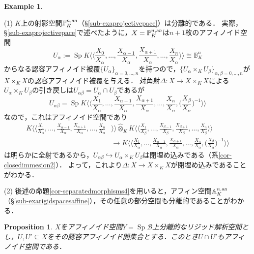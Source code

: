 \documentclass[a4paper,12pt, dvipdfmx]{jsbook}
\def\P{\mathbb{P}}
\def\A{\mathbb{A}}
\def\B{\mathbb{B}}
\def\Sp{\mathop{\mathrm{Sp}}\nolimits}
\def\an{\textsl{an}}
\def\dl{\langle\!\langle}
\def\dr{\rangle\!\rangle}
\theoremstyle{plain}
\newtheorem{prop}[thm]{\bfseries Proposition}
\theoremstyle{definition}
\newtheorem{exa}[thm]{\bfseries Example}
\begin{document}
\begin{exa}\label{exa-separatedmorphisms}{\rm 
(1) $K$上の射影空間$\P^{n,\an}_K$（\S\ref{sub-exaprojectivepace}）は分離的である．
実際，\S\ref{sub-exaprojectivepace}で述べたように，$X=\P^{n,\an}_K$は$n+1$枚のアフィノイド空間
$$
U_{\alpha}:=\Sp K\dl {\textstyle \frac{X_0}{X_{\alpha}},\ldots,\frac{X_{\alpha-1}}{X_{\alpha}},\frac{X_{\alpha+1}}{X_{\alpha}},\ldots,\frac{X_n}{X_{\alpha}}}\dr\cong\B^n_K
$$
からなる認容アフィノイド被覆$\{U_{\alpha}\}_{\alpha=0,\ldots,n}$を持つので，$\{U_{\alpha}\times_KU_{\beta}\}_{\alpha,\beta=0,\ldots,n}$が$X\times_KX$の認容アフィノイド被覆を与える．
対角射$\Delta\colon X\rightarrow X\times_KX$による$U_{\alpha}\times_KU_{\beta}$の引き戻しは$U_{\alpha\beta}=U_{\alpha}\cap U_{\beta}$であるが
$$
U_{\alpha\beta}=\Sp K\dl {\textstyle \frac{X_1}{X_{\alpha}},\ldots,\frac{X_{\alpha-1}}{X_{\alpha}},\frac{X_{\alpha+1}}{X_{\alpha}},\ldots,\frac{X_n}{X_{\alpha}},\big(\frac{X_{\beta}}{X_{\alpha}}\big)^{-1}}\dr
$$
なので，これはアフィノイド空間であり
\begin{equation*}
\begin{split}
K\dl {\textstyle \frac{X_1}{X_{\alpha}},\ldots,\frac{X_{\alpha-1}}{X_{\alpha}},\frac{X_{\alpha+1}}{X_{\alpha}},\ldots,\frac{X_n}{X_{\alpha}}}&\dr\widehat{\otimes}_KK\dl {\textstyle \frac{X_1}{X_{\beta}},\ldots,\frac{X_{\beta-1}}{X_{\beta}},\frac{X_{\beta+1}}{X_{\beta}},\ldots,\frac{X_n}{X_{\beta}}}\dr\\ &\longrightarrow K\dl {\textstyle \frac{X_1}{X_{\alpha}},\ldots,\frac{X_{\alpha-1}}{X_{\alpha}},\frac{X_{\alpha+1}}{X_{\alpha}},\ldots,\frac{X_n}{X_{\alpha}},\big(\frac{X_{\beta}}{X_{\alpha}}\big)^{-1}}\dr
\end{split}
\end{equation*}
は明らかに全射であるから，$U_{\alpha\beta}\hookrightarrow U_{\alpha}\times_KU_{\beta}$は閉埋め込みである（系\ref{cor-closedimmesion2}）．
よって，これより$\Delta\colon X\rightarrow X\times_KX$が閉埋め込みであることがわかる．

(2) 後述の命題\ref{cor-separatedmorphisms4}を用いると，アフィン空間$\A^{n,\an}_K$（\S\ref{sub-exarigidspacesaffine}），その任意の部分空間も分離的であることがわかる．}
\end{exa}

\begin{prop}\label{prop-separatedmorphisms2}{\rm 
$X$をアフィノイド空間$Y=\Sp\mathcal{B}$上分離的なリジッド解析空間とし，$U,U'\subseteq X$をその認容アフィノイド開集合とする．このとき$U\cap U'$もアフィノイド空間である．}
\end{prop}
\end{document}
